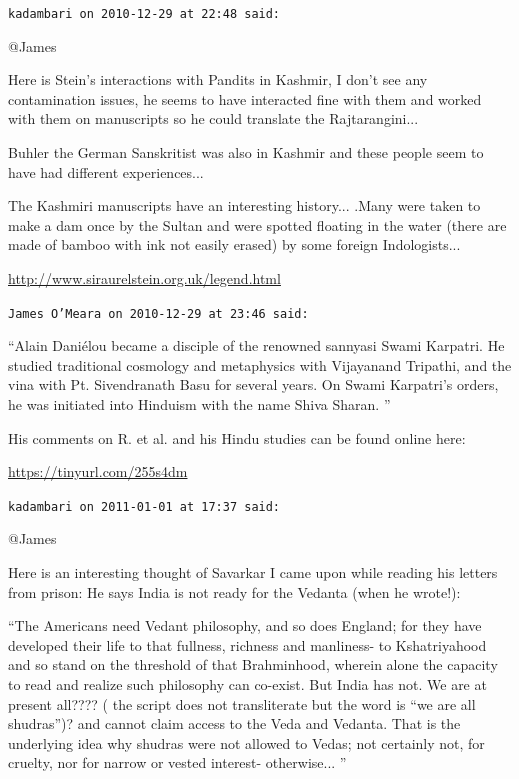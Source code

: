 \begin{footnotesize}
\begin{sffamily}
\hfill

\texttt{kadambari on 2010-12-29 at 22:48 said:}

@James

Here is Stein's interactions with Pandits in Kashmir, I don't see any contamination issues, he seems to have interacted fine with them and worked with them on manuscripts so he could translate the Rajtarangini... 

Buhler the German Sanskritist was also in Kashmir and these people seem to have had different experiences... 

The Kashmiri manuscripts have an interesting history... .Many were taken to make a dam once by the Sultan and were spotted floating in the water (there are made of bamboo with ink not easily erased) by some foreign Indologists... 

\url{http://www.siraurelstein.org.uk/legend.html}


\hfill

\texttt{James O'Meara on 2010-12-29 at 23:46 said:}

``Alain Daniélou became a disciple of the renowned sannyasi Swami Karpatri. He studied traditional cosmology and metaphysics with Vijayanand Tripathi, and the vina with Pt. Sivendranath Basu for several years. On Swami Karpatri's orders, he was initiated into Hinduism with the name Shiva Sharan. ''

His comments on R. et al. and his Hindu studies can be found online here:

\url{https://tinyurl.com/255s4dm}


\hfill

\texttt{kadambari on 2011-01-01 at 17:37 said:}

@James

Here is an interesting thought of Savarkar I came upon while reading his letters from prison: He says India is not ready for the Vedanta (when he wrote!):

``The Americans need Vedant philosophy, and so does England; for they have developed their life to that fullness, richness and manliness- to Kshatriyahood and so stand on the threshold of that Brahminhood, wherein alone the capacity to read and realize such philosophy can co-exist. But India has not. We are at present all???? ( the script does not transliterate but the word is ``we are all shudras'')? and cannot claim access to the Veda and Vedanta. That is the underlying idea why shudras were not allowed to Vedas; not certainly not, for cruelty, nor for narrow or vested interest- otherwise... ''


\end{sffamily}
\end{footnotesize}
